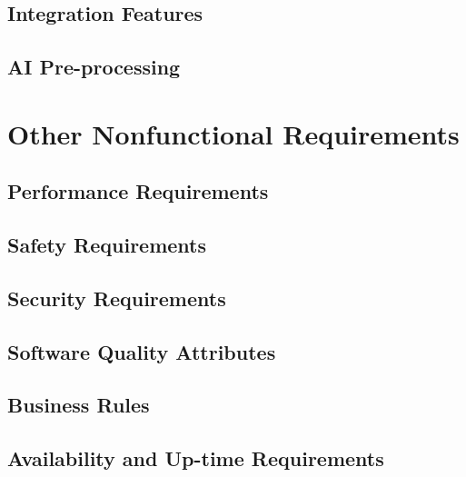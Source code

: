         \section{Integration Features}
            
        \section{AI Pre-processing}  
            

    \newpage
    \chapter{Other Nonfunctional Requirements}\label{Other Nonfunctional Requirements}
        \section{Performance Requirements}
            
        \section{Safety Requirements}
            
        \section{Security Requirements}
            
        \section{Software Quality Attributes}
            
        \section{Business Rules}
            
        \section{Availability and Up-time Requirements}
            
